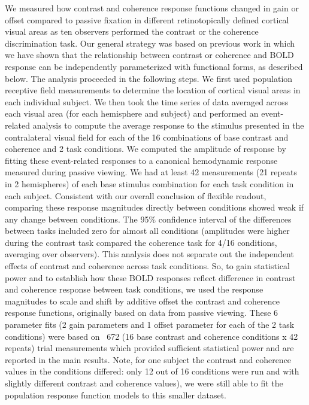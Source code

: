 \documentclass{report}
\begin{document}
We measured how contrast and coherence response functions changed in gain or offset compared to passive fixation in different retinotopically defined cortical visual areas as ten observers performed the contrast or the coherence discrimination task. Our general strategy was based on previous work \citep{Birman2018-sp} in which we have shown that the relationship between contrast or coherence and BOLD response can be independently parameterized with functional forms, as described below. The analysis proceeded in the following steps. We first used population receptive field measurements \citep{Dumoulin2008-uc} to determine the location of cortical visual areas in each individual subject. We then took the time series of data averaged across each visual area (for each hemisphere and subject) and performed an event-related analysis to compute the average response to the stimulus presented in the contralateral visual field for each of the 16 combinations of base contrast and coherence and 2 task conditions. We computed the amplitude of response by fitting these event-related responses to a canonical hemodynamic response measured during passive viewing. We had at least 42 measurements (21 repeats in 2 hemispheres) of each base stimulus combination for each task condition in each subject. Consistent with our overall conclusion of flexible readout, comparing these response magnitudes directly between conditions showed weak if any change between conditions. The 95\% confidence interval of the differences between tasks included zero for almost all conditions (amplitudes were higher during the contrast task compared the coherence task for 4/16 conditions, averaging over observers). This analysis does not separate out the independent effects of contrast and coherence across task conditions. So, to gain statistical power and to establish how these BOLD responses reflect difference in contrast and coherence response between task conditions, we used the response magnitudes to scale and shift by additive offset the contrast and coherence response functions, originally based on data from passive viewing. These 6 parameter fits (2 gain parameters and 1 offset parameter for each of the 2 task conditions) were based on ~672 (16 base contrast and coherence conditions x 42 repeats) trial measurements which provided sufficient statistical power and are reported in the main results. Note, for one subject the contrast and coherence values in the conditions differed: only 12 out of 16 conditions were run and with slightly different contrast and coherence values), we were still able to fit the population response function models to this smaller dataset. 
\end{document}
